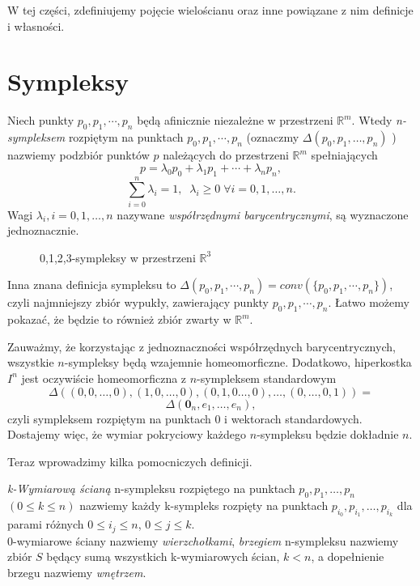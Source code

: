 W tej części, zdefiniujemy pojęcie wielościanu oraz inne powiązane z nim definicje i własności.


\section{Sympleksy}
\begin{defi}
    Niech punkty $p_0, p_1, \cdots, p_n$ będą afinicznie niezależne w przestrzeni $\mathbb{R}^m$. Wtedy \emph{n-sympleksem} rozpiętym na punktach $p_0, p_1, \cdots , p_n$ (oznaczmy $\Delta(p_0, p_1, \ldots , p_n)$ ) nazwiemy podzbiór punktów $p$ należących do przestrzeni $\mathbb{R}^m$ spełniających
    \[p=\lambda_0 p_0+ \lambda_1 p_1 +\cdots + \lambda_n p_n,\]
    \[\sum _{i=0}^n \lambda_i = 1, \;\; \lambda _i\geq 0 \;\forall i=0,1,\ldots,n.\]
    Wagi $\lambda_i, i=0,1,\ldots,n$ nazywane \emph{współrzędnymi barycentrycznymi}, są wyznaczone jednoznacznie.
    \begin{figure}[H]
        \centering
        
        \caption{0,1,2,3-sympleksy w przestrzeni $\mathbb{R}^3$}
        \label{fig:sympleksy}
    \end{figure}
\end{defi}
Inna znana definicja sympleksu to $\Delta(p_0, p_1, \cdots , p_n)=conv(\{p_0, p_1, \cdots , p_n\})$, czyli najmniejszy zbiór wypukły, zawierający punkty $p_0, p_1, \cdots , p_n$. Łatwo możemy pokazać, że będzie to również zbiór zwarty w $\mathbb{R}^m$.

Zauważmy, że korzystając z jednoznaczności współrzędnych barycentrycznych, wszystkie $n$-sympleksy będą wzajemnie homeomorficzne. Dodatkowo, hiperkostka $I^n$ jest oczywiście homeomorficzna z $n$-sympleksem standardowym 
\[\Delta((0,0,\ldots, 0), (1,0,\ldots,0), (0,1,0\ldots,0), \ldots, (0,\ldots,0,1)) = \]
\[\Delta(\mathbf{0}_n, e_1, \ldots, e_n), \]
czyli sympleksem rozpiętym na punktach $0$ i wektorach standardowych. Dostajemy więc, że wymiar pokryciowy każdego $n$-sympleksu będzie dokładnie $n$. 

Teraz wprowadzimy kilka pomocniczych definicji.

\begin{defi}
    \emph{k-Wymiarową ścianą} n-sympleksu rozpiętego na punktach $p_0, p_1, \ldots, p_n$ $(0\le k\le n)$ nazwiemy każdy k-sympleks rozpięty na punktach $p_{i_0}, p_{i_1},\ldots, p_{i_k}$ dla parami różnych $0\le i_j\le n$, $0\le j\le k$.\\
    0-wymiarowe ściany nazwiemy \emph{wierzchołkami}, 
    \emph{brzegiem} n-sympleksu nazwiemy zbiór $S$ będący sumą wszystkich k-wymiarowych ścian, $ k<n$,
    a dopełnienie brzegu nazwiemy \emph{wnętrzem}.
\end{defi}

